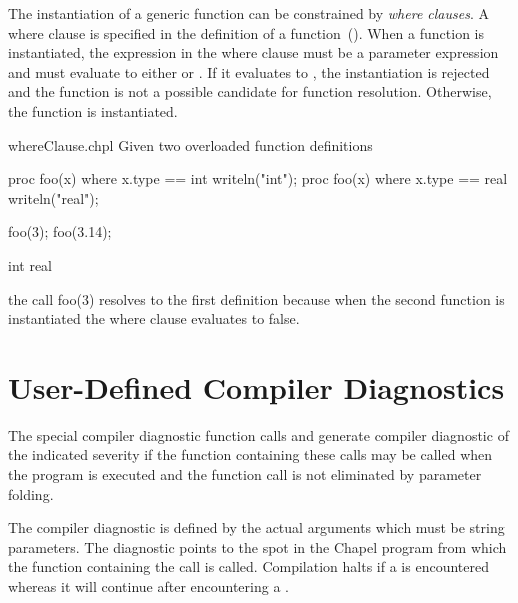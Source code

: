The instantiation of a generic function can be constrained by {\em
where clauses}.  A where clause is specified in the definition of a
function~().  When a function is
instantiated, the expression in the where clause must be a parameter
expression and must evaluate to either  or .
If it evaluates to , the instantiation is rejected and the
function is not a possible candidate for function resolution.
Otherwise, the function is instantiated.
\begin{chapelexample}{whereClause.chpl}
Given two overloaded function definitions
\begin{chapel}
proc foo(x) where x.type == int { writeln("int"); }
proc foo(x) where x.type == real { writeln("real"); }
\end{chapel}
\begin{chapelpost}
foo(3);
foo(3.14);
\end{chapelpost}
\begin{chapeloutput}
int
real
\end{chapeloutput}
the call foo(3) resolves to the first definition because when the
second function is instantiated the where clause evaluates to false.
\end{chapelexample}

\section{User-Defined Compiler Diagnostics}
\label{User_Defined_Compiler_Errors}

The special compiler diagnostic function calls 
and  generate compiler diagnostic of the
indicated severity if the function containing these calls may be
called when the program is executed and the function call is not
eliminated by parameter folding.

The compiler diagnostic is defined by the actual arguments which must
be string parameters.  The diagnostic points to the spot in the Chapel
program from which the function containing the call is called.
Compilation halts if a  is encountered whereas it
will continue after encountering a .


